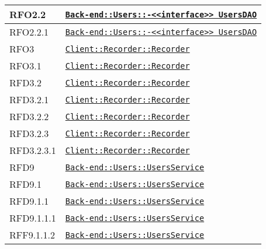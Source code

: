 \begin{longtable}{|>{\centering}m{3cm}|m{10cm}<{\centering}|}
RFO2.2 & \hyperref[Back-end::Users::<<interface>> UsersDAO]{\texttt{Back-end::Users::-\linebreak <<interface>> UsersDAO}}\\ \hline

RFO2.2.1 & \hyperref[Back-end::Users::<<interface>> UsersDAO]{\texttt{Back-end::Users::-\linebreak <<interface>> UsersDAO}}\\ \hline

RFO3 & \hyperref[Client::Recorder::Recorder]{\texttt{Client::Recorder::Recorder}}\\ \hline

RFO3.1 & \hyperref[Client::Recorder::Recorder]{\texttt{Client::Recorder::Recorder}}\\ \hline

RFD3.2 & \hyperref[Client::Recorder::Recorder]{\texttt{Client::Recorder::Recorder}}\\ \hline

RFD3.2.1 & \hyperref[Client::Recorder::Recorder]{\texttt{Client::Recorder::Recorder}}\\ \hline

RFD3.2.2 & \hyperref[Client::Recorder::Recorder]{\texttt{Client::Recorder::Recorder}}\\ \hline

RFD3.2.3 & \hyperref[Client::Recorder::Recorder]{\texttt{Client::Recorder::Recorder}}\\ \hline

RFD3.2.3.1 & \hyperref[Client::Recorder::Recorder]{\texttt{Client::Recorder::Recorder}}\\ \hline

RFD9 & \hyperref[Back-end::Users::UsersService]{\texttt{Back-end::Users::UsersService}}\\ \hline

RFD9.1 & \hyperref[Back-end::Users::UsersService]{\texttt{Back-end::Users::UsersService}}\\ \hline

RFD9.1.1 & \hyperref[Back-end::Users::UsersService]{\texttt{Back-end::Users::UsersService}}\\ \hline

RFD9.1.1.1 & \hyperref[Back-end::Users::UsersService]{\texttt{Back-end::Users::UsersService}}\\ \hline

RFF9.1.1.2 & \hyperref[Back-end::Users::UsersService]{\texttt{Back-end::Users::UsersService}}\\ \hline


\end{longtable}
